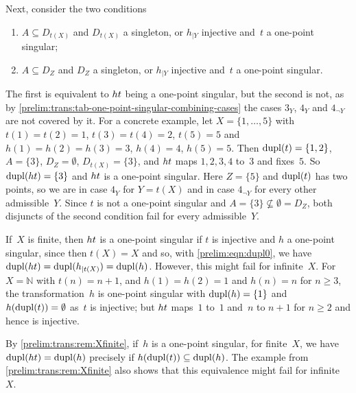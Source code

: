\begin{remark}
	Next, consider the two conditions
	\begin{enumerate}
		\item $A \subseteq D_{t(X)}$ and $D_{t(X)}$ a singleton, or $h_{|Y}$
		injective and~$t$ a one-point singular;
		
		\item $A \subseteq D_Z$ and $D_Z$ a singleton, or $h_{|Y}$ injective
		and~$t$ a one-point singular.
	\end{enumerate}
	The first is equivalent to $\concat{t}{h}$ being a one-point singular, but the
	second is not, as by
	\cref{prelim:trans:tab-one-point-singular-combining-cases} the cases $3_Y$,
	$4_Y$ and $4_{\lnot Y}$ are not covered by it.
	For a concrete example, 
	let $X = \{1,\ldots,5\}$ with
	$t(1) = t(2) = 1$, $t(3) = t(4) = 2$, $t(5) = 5$ and
	$h(1) = h(2) = h(3) = 3$, $h(4) = 4$, $h(5) = 5$.
	Then $\dupl{t} = \{1,2\}$, $A = \{3\}$, $D_Z = \emptyset$,
	$D_{t(X)} = \{3\}$, and $\concat{t}{h}$ maps $1,2,3,4$ to~$3$ and fixes~$5$.
	So $\dupl{\concat{t}{h}} = \{3\}$ and $\concat{t}{h}$ is a one-point singular.
	Here $Z = \{5\}$ and $\dupl{t}$ has two points, so we are in case $4_Y$ for
	$Y = t(X)$ and in case $4_{\lnot Y}$ for every other admissible~$Y$.
	Since $t$ is not a
	one-point singular and $A = \{3\} \not\subseteq \emptyset = D_Z$, both
	disjuncts of the second condition fail for every admissible~$Y$.
\end{remark}

\begin{remark} \label{prelim:trans:rem:Xfinite}
	If~$X$ is finite, then $\concat{t}{h}$ is a one-point singular
	if $t$ is injective and $h$ a one-point singular,
	since then $t(X) = X$ and so, with \cref{prelim:eqn:dupl0},
	we have $\dupl{\concat{t}{h}} = \dupl{h_{|t(X)}} = \dupl{h}$.
	However, this might fail for infinite~$X$.
	For $X = \mathbb{N}$ with $t(n) = n+1$, and
	$h(1) = h(2) = 1$ and $h(n) = n$ for $n \ge 3$, the transformation~$h$ is
	one-point singular with $\dupl{h} = \{1\}$ and $h(\dupl{t}) = \emptyset$
	as~$t$ is injective; but $\concat{t}{h}$ maps~$1$ to~$1$ and~$n$ to $n+1$
	for $n \ge 2$ and hence is injective.
\end{remark}

\begin{remark}
	By \cref{prelim:trans:rem:Xfinite}, if~$h$ is a one-point singular,
	for finite~$X$, we have $\dupl{\concat{t}{h}} = \dupl{h}$
	precisely if $h(\dupl{t}) \subseteq \dupl{h}$. The example from
	\cref{prelim:trans:rem:Xfinite}
	also shows that this equivalence might fail for infinite~$X$.
\end{remark}

